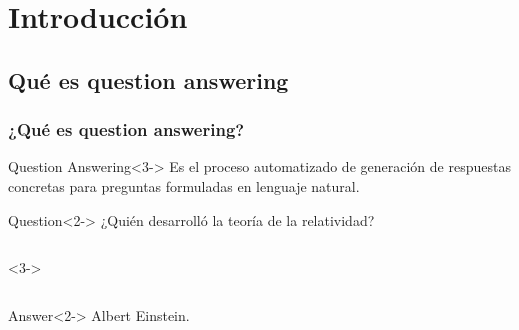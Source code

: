 \section{Introducción}

\subsection{Qué es question answering}

\begin{frame}
  \frametitle{¿Qué es question answering?}
  \begin{block}{Question Answering}<3->
      Es el proceso automatizado de generación de respuestas concretas para preguntas formuladas en lenguaje natural.
  \end{block}
  \bigskip

 \begin{alertblock}{Question}<2->
      ¿Quién desarrolló la teoría de la relatividad?
  \end{alertblock}

  \begin{columns}<3->
      \begin{column}{.5\textwidth}
      \end{column}
      \begin{column}{.1\textwidth}
      \end{column}
      \begin{column}{.3\textwidth}
      \end{column}
      \begin{column}{.5\textwidth}

      \end{column}
  \end{columns}

  \begin{exampleblock}{Answer}<2->
      Albert Einstein.
  \end{exampleblock}
\end{frame}

